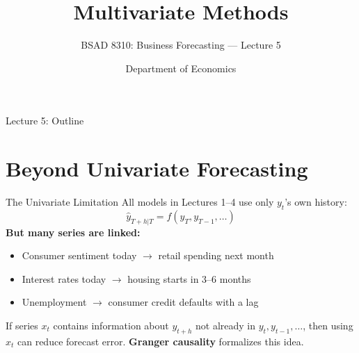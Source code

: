 \documentclass[aspectratio=169, 11pt]{beamer}
\title{Multivariate Methods}
\subtitle{BSAD 8310: Business Forecasting --- Lecture 5}
\author{Department of Economics}
\institute{University of Nebraska at Omaha}
\begin{document}

\begin{frame}
  \titlepage
\end{frame}

\begin{frame}{Lecture 5: Outline}
  \tableofcontents
\end{frame}

\section{Beyond Univariate Forecasting}


\begin{frame}{The Univariate Limitation}
  All models in Lectures 1--4 use only $y_t$'s own history:
  \[
    \hat{y}_{T+h|T} = f(y_T, y_{T-1}, \ldots)
  \]
  \textbf{But many series are linked:}
  \begin{itemize}
    \item Consumer sentiment today $\to$ retail spending next month
    \item Interest rates today $\to$ housing starts in 3--6 months
    \item Unemployment $\to$ consumer credit defaults with a lag
  \end{itemize}
  \begin{keybox}
    If series $x_t$ contains information about $y_{t+h}$ not already in
    $y_t, y_{t-1}, \ldots$, then using $x_t$ can reduce forecast error.
    \textbf{Granger causality} formalizes this idea.
  \end{keybox}
\end{frame}
\end{document}
